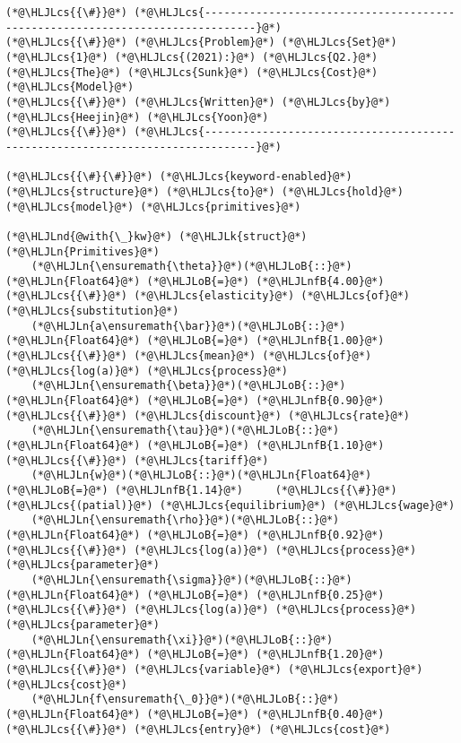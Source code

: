 \documentclass[12pt,a4paper]{article}
\newcommand{\HLJLk}[1]{\textcolor[RGB]{148,91,176}{\textbf{#1}}}
\newcommand{\HLJLn}[1]{#1}
\newcommand{\HLJLnd}[1]{\textcolor[RGB]{214,102,97}{#1}}
\newcommand{\HLJLnfB}[1]{\textcolor[RGB]{59,151,46}{#1}}
\newcommand{\HLJLoB}[1]{\textcolor[RGB]{102,102,102}{\textbf{#1}}}
\newcommand{\HLJLcs}[1]{\textcolor[RGB]{153,153,119}{\textit{#1}}}
\begin{document}
\begin{lstlisting}
(*@\HLJLcs{{\#}}@*) (*@\HLJLcs{------------------------------------------------------------------------------}@*)
(*@\HLJLcs{{\#}}@*) (*@\HLJLcs{Problem}@*) (*@\HLJLcs{Set}@*) (*@\HLJLcs{1}@*) (*@\HLJLcs{(2021):}@*) (*@\HLJLcs{Q2.}@*) (*@\HLJLcs{The}@*) (*@\HLJLcs{Sunk}@*) (*@\HLJLcs{Cost}@*) (*@\HLJLcs{Model}@*)
(*@\HLJLcs{{\#}}@*) (*@\HLJLcs{Written}@*) (*@\HLJLcs{by}@*) (*@\HLJLcs{Heejin}@*) (*@\HLJLcs{Yoon}@*)
(*@\HLJLcs{{\#}}@*) (*@\HLJLcs{------------------------------------------------------------------------------}@*)

(*@\HLJLcs{{\#}{\#}}@*) (*@\HLJLcs{keyword-enabled}@*) (*@\HLJLcs{structure}@*) (*@\HLJLcs{to}@*) (*@\HLJLcs{hold}@*) (*@\HLJLcs{model}@*) (*@\HLJLcs{primitives}@*)

(*@\HLJLnd{@with{\_}kw}@*) (*@\HLJLk{struct}@*) (*@\HLJLn{Primitives}@*)
    (*@\HLJLn{\ensuremath{\theta}}@*)(*@\HLJLoB{::}@*)(*@\HLJLn{Float64}@*) (*@\HLJLoB{=}@*) (*@\HLJLnfB{4.00}@*)     (*@\HLJLcs{{\#}}@*) (*@\HLJLcs{elasticity}@*) (*@\HLJLcs{of}@*) (*@\HLJLcs{substitution}@*)
    (*@\HLJLn{a\ensuremath{\bar}}@*)(*@\HLJLoB{::}@*)(*@\HLJLn{Float64}@*) (*@\HLJLoB{=}@*) (*@\HLJLnfB{1.00}@*)     (*@\HLJLcs{{\#}}@*) (*@\HLJLcs{mean}@*) (*@\HLJLcs{of}@*) (*@\HLJLcs{log(a)}@*) (*@\HLJLcs{process}@*)
    (*@\HLJLn{\ensuremath{\beta}}@*)(*@\HLJLoB{::}@*)(*@\HLJLn{Float64}@*) (*@\HLJLoB{=}@*) (*@\HLJLnfB{0.90}@*)     (*@\HLJLcs{{\#}}@*) (*@\HLJLcs{discount}@*) (*@\HLJLcs{rate}@*)
    (*@\HLJLn{\ensuremath{\tau}}@*)(*@\HLJLoB{::}@*)(*@\HLJLn{Float64}@*) (*@\HLJLoB{=}@*) (*@\HLJLnfB{1.10}@*)     (*@\HLJLcs{{\#}}@*) (*@\HLJLcs{tariff}@*)
    (*@\HLJLn{w}@*)(*@\HLJLoB{::}@*)(*@\HLJLn{Float64}@*) (*@\HLJLoB{=}@*) (*@\HLJLnfB{1.14}@*)     (*@\HLJLcs{{\#}}@*) (*@\HLJLcs{(patial)}@*) (*@\HLJLcs{equilibrium}@*) (*@\HLJLcs{wage}@*)
    (*@\HLJLn{\ensuremath{\rho}}@*)(*@\HLJLoB{::}@*)(*@\HLJLn{Float64}@*) (*@\HLJLoB{=}@*) (*@\HLJLnfB{0.92}@*)     (*@\HLJLcs{{\#}}@*) (*@\HLJLcs{log(a)}@*) (*@\HLJLcs{process}@*) (*@\HLJLcs{parameter}@*)
    (*@\HLJLn{\ensuremath{\sigma}}@*)(*@\HLJLoB{::}@*)(*@\HLJLn{Float64}@*) (*@\HLJLoB{=}@*) (*@\HLJLnfB{0.25}@*)     (*@\HLJLcs{{\#}}@*) (*@\HLJLcs{log(a)}@*) (*@\HLJLcs{process}@*) (*@\HLJLcs{parameter}@*)
    (*@\HLJLn{\ensuremath{\xi}}@*)(*@\HLJLoB{::}@*)(*@\HLJLn{Float64}@*) (*@\HLJLoB{=}@*) (*@\HLJLnfB{1.20}@*)     (*@\HLJLcs{{\#}}@*) (*@\HLJLcs{variable}@*) (*@\HLJLcs{export}@*) (*@\HLJLcs{cost}@*)
    (*@\HLJLn{f\ensuremath{\_0}}@*)(*@\HLJLoB{::}@*)(*@\HLJLn{Float64}@*) (*@\HLJLoB{=}@*) (*@\HLJLnfB{0.40}@*)    (*@\HLJLcs{{\#}}@*) (*@\HLJLcs{entry}@*) (*@\HLJLcs{cost}@*)

\end{lstlisting}
\end{document}
